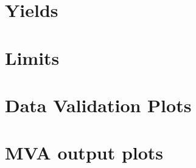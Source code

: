 \documentclass{cmspaper}
\begin{document}
\section{Yields}

\clearpage
\section{Limits}

\clearpage
\section{Data Validation Plots}
\label{app:lp_postEPSdist}

\clearpage
\section{MVA output plots}
\label{app:lp_mvaplots}






\clearpage

\end{document}
